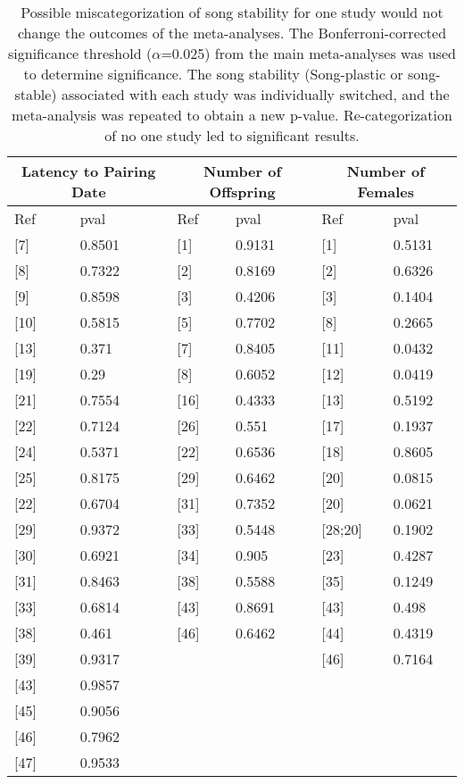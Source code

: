 \documentclass{article}
\begin{document}
\renewcommand{\thetable}{\textbf{SA\arabic{table}}}


\begin{table}[H]
\caption{Possible miscategorization of song stability for one study would not change the outcomes of the meta-analyses.  The Bonferroni-corrected significance threshold ($\alpha$=0.025) from the main meta-analyses was used to determine significance.  The song stability (Song-plastic or song-stable) associated with each study was individually switched, and the meta-analysis was repeated to obtain a new p-value. Re-categorization of no one study led to significant results.}
\centering
\begin{tabular}{|ll|ll|ll|}
  \hline
  \multicolumn{2}{|c}{Latency to Pairing Date} &
  \multicolumn{2}{|c|}{Number of Offspring} &
  \multicolumn{2}{c|}{Number of Females}\\
  \hline
Ref & pval & Ref & pval & Ref & pval \\ 
\hline
  {[7]} & 0.8501 & {[1]}  & 0.9131 & {[1]}  & 0.5131 \\ 
  {[8]} & 0.7322 & {[2]}  & 0.8169 & {[2]}  & 0.6326 \\ 
  {[9]} & 0.8598 & {[3]}  & 0.4206 & {[3]}  & 0.1404 \\ 
  {[10]} & 0.5815 & {[5]}  & 0.7702 & {[8]} & 0.2665 \\ 
  {[13]} & 0.371 & {[7]} & 0.8405 & {[11]} & 0.0432 \\ 
  {[19]} & 0.29 & {[8]} & 0.6052 & {[12]} & 0.0419 \\ 
  {[21]} & 0.7554 & {[16]} & 0.4333 & {[13]} & 0.5192 \\ 
  {[22]} & 0.7124 & {[26]} & 0.551 & {[17]} & 0.1937 \\ 
  {[24]} & 0.5371 & {[22]} & 0.6536 & {[18]} & 0.8605 \\ 
  {[25]} & 0.8175 & {[29]} & 0.6462 & {[20]} & 0.0815 \\ 
  {[22]} & 0.6704 & {[31]} & 0.7352 & {[20]} & 0.0621 \\ 
  {[29]} & 0.9372 & {[33]} & 0.5448 & {[28;20]} & 0.1902 \\ 
  {[30]} & 0.6921 & {[34]} & 0.905 & {[23]} & 0.4287 \\ 
  {[31]} & 0.8463 & {[38]} & 0.5588 & {[35]} & 0.1249 \\ 
  {[33]} & 0.6814 & {[43]} & 0.8691 & {[43]} & 0.498 \\ 
  {[38]} & 0.461 & {[46]} & 0.6462 & {[44]} & 0.4319 \\ 
  {[39]} & 0.9317 &  &  & {[46]} & 0.7164 \\ 
  {[43]} & 0.9857 &  &  &  &  \\ 
  {[45]} & 0.9056 &  &  &  &  \\ 
  {[46]} & 0.7962 &  &  &  &  \\ 
  {[47]} & 0.9533 &  &  &  &  \\ 
   \hline
\end{tabular} 
\end{table}
\end{document}
